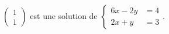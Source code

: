$\begin{pmatrix}1\\1\end{pmatrix}$ est une solution de $\begin{cases}6x-2y &= 4 \\ 2x+y &= 3\end{cases}$.

\begin{reponses}
\end{reponses}

